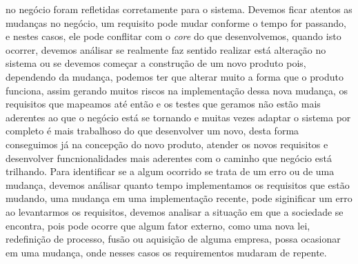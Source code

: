       no negócio foram refletidas corretamente para o sistema. \newline
      Devemos ficar atentos as mudanças no negócio, um requisito pode mudar conforme
      o tempo for passando, e nestes casos, ele pode conflitar com o \textit{core}
      do que desenvolvemos, quando isto ocorrer, devemos análisar se realmente faz
      sentido realizar está alteração no sistema ou se devemos começar a construção
      de um novo produto pois, dependendo da mudança, podemos ter que alterar muito
      a forma que o produto funciona, assim gerando muitos riscos na implementação
      dessa nova mudança, os requisitos que mapeamos até então e os testes que
      geramos não estão mais aderentes ao que o negócio está se tornando e muitas
      vezes adaptar o sistema por completo é mais trabalhoso do que desenvolver um
      novo, desta forma conseguimos já na concepção do novo produto, atender os
      novos requisitos e desenvolver funcnionalidades mais aderentes com o caminho
      que negócio está trilhando. Para identificar se a algum ocorrido se trata de
      um erro ou de uma mudança, devemos análisar quanto tempo implementamos os
      requisitos que estão mudando, uma mudança em uma implementação recente, pode
      siginificar um erro ao levantarmos os requisitos, devemos analisar a situação
      em que a sociedade se encontra, pois pode ocorre que algum fator externo, como
      uma nova lei, redefinição de processo, fusão ou aquisição de alguma empresa,
      possa ocasionar em uma mudança, onde nesses casos os requirementos mudaram
      de repente.

